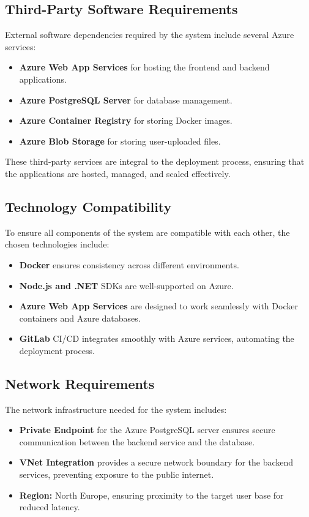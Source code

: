 \subsection{Third-Party Software Requirements}
External software dependencies required by the system include several Azure services:
\begin{itemize}
    \item \textbf{Azure Web App Services} for hosting the frontend and backend applications.
    \item \textbf{Azure PostgreSQL Server} for database management.
    \item \textbf{Azure Container Registry} for storing Docker images.
    \item \textbf{Azure Blob Storage} for storing user-uploaded files.
\end{itemize}
These third-party services are integral to the deployment process, ensuring that the applications are hosted, managed, and scaled effectively.

\subsection{Technology Compatibility}
To ensure all components of the system are compatible with each other, the chosen technologies include:
\begin{itemize}
    \item \textbf{Docker} ensures consistency across different environments.
    \item \textbf{Node.js and .NET} SDKs are well-supported on Azure.
    \item \textbf{Azure Web App Services} are designed to work seamlessly with Docker containers and Azure databases.
    \item \textbf{GitLab} CI/CD integrates smoothly with Azure services, automating the deployment process.
\end{itemize}

\subsection{Network Requirements}
The network infrastructure needed for the system includes:
\begin{itemize}
    \item \textbf{Private Endpoint} for the Azure PostgreSQL server ensures secure communication between the backend service and the database.
    \item \textbf{VNet Integration} provides a secure network boundary for the backend services, preventing exposure to the public internet.
    \item \textbf{Region:} North Europe, ensuring proximity to the target user base for reduced latency.
\end{itemize}

